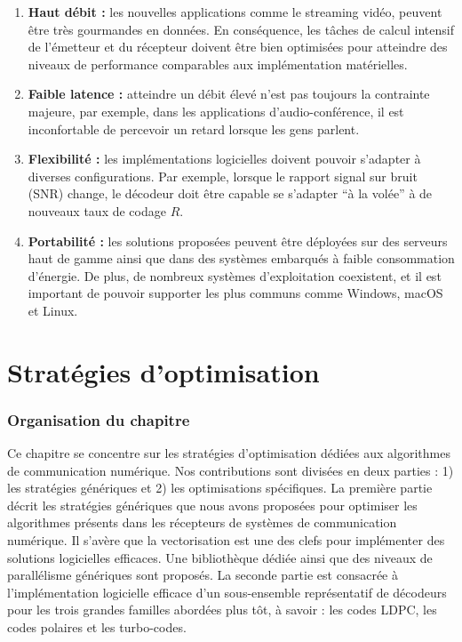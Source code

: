 \begin{enumerate}
  \item \textbf{Haut débit :}
    les nouvelles applications comme le streaming vidéo, peuvent être très
    gourmandes en données. En conséquence, les tâches de calcul intensif de
    l'émetteur et du récepteur doivent être bien optimisées pour atteindre des
    niveaux de performance comparables aux implémentation matérielles.

  \item \textbf{Faible latence :}
    atteindre un débit élevé n'est pas toujours la contrainte majeure, par
    exemple, dans les applications d'audio-conférence, il est inconfortable de
    percevoir un retard lorsque les gens parlent.

  \item \textbf{Flexibilité :}
    les implémentations logicielles doivent pouvoir s'adapter à diverses
    configurations. Par exemple, lorsque le rapport signal sur bruit (SNR)
    change, le décodeur doit être capable se s'adapter ``à la volée'' à de
    nouveaux taux de codage $R$.

  \item \textbf{Portabilité :}
    les solutions proposées peuvent être déployées sur des serveurs haut de
    gamme ainsi que dans des systèmes embarqués à faible consommation d'énergie.
    De plus, de nombreux systèmes d'exploitation coexistent, et il est important
    de pouvoir supporter les plus communs comme Windows, macOS et Linux.
\end{enumerate}

\section*{Stratégies d'optimisation}

\subsubsection*{Organisation du chapitre}

Ce chapitre se concentre sur les stratégies d'optimisation dédiées aux
algorithmes de communication numérique. Nos contributions sont divisées en deux
parties : 1) les stratégies génériques et 2) les optimisations spécifiques.
La première partie décrit les stratégies génériques que nous avons proposées
pour optimiser les algorithmes présents dans les récepteurs de systèmes de
communication numérique. Il s'avère que la vectorisation est une des clefs pour
implémenter des solutions logicielles efficaces. Une bibliothèque dédiée ainsi
que des niveaux de parallélisme génériques sont proposés. La seconde partie est
consacrée à l'implémentation logicielle efficace d'un sous-ensemble
représentatif de décodeurs pour les trois grandes familles abordées plus tôt, à
savoir : les codes LDPC, les codes polaires et les turbo-codes.

